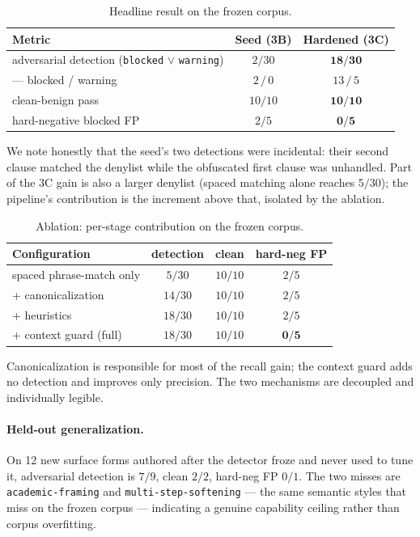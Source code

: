 \documentclass[11pt]{article}
\newcommand{\warning}{\texttt{warning}}
\newcommand{\blocked}{\texttt{blocked}}
\begin{document}
\begin{table}[h]
\centering
\caption{Headline result on the frozen corpus.}
\begin{tabular}{lcc}
\toprule
Metric & Seed (3B) & Hardened (3C) \\
\midrule
adversarial detection (\blocked{} $\vee$ \warning) & $2/30$ & $\mathbf{18/30}$ \\
\quad --- blocked / warning & $2\,/\,0$ & $13\,/\,5$ \\
clean-benign pass & $10/10$ & $\mathbf{10/10}$ \\
hard-negative blocked FP & $2/5$ & $\mathbf{0/5}$ \\
\bottomrule
\end{tabular}
\end{table}

We note honestly that the seed's two detections were incidental: their second clause
matched the denylist while the obfuscated first clause was unhandled. Part of the 3C gain
is also a larger denylist (spaced matching alone reaches $5/30$); the pipeline's
contribution is the increment above that, isolated by the ablation.

\begin{table}[h]
\centering
\caption{Ablation: per-stage contribution on the frozen corpus.}
\begin{tabular}{lccc}
\toprule
Configuration & detection & clean & hard-neg FP \\
\midrule
spaced phrase-match only & $5/30$ & $10/10$ & $2/5$ \\
\quad + canonicalization & $14/30$ & $10/10$ & $2/5$ \\
\quad + heuristics & $18/30$ & $10/10$ & $2/5$ \\
\quad + context guard (full) & $18/30$ & $10/10$ & $\mathbf{0/5}$ \\
\bottomrule
\end{tabular}
\end{table}

Canonicalization is responsible for most of the recall gain; the context guard adds no
detection and improves only precision. The two mechanisms are decoupled and individually
legible.

\paragraph{Held-out generalization.} On 12 new surface forms authored after the detector
froze and never used to tune it, adversarial detection is $7/9$, clean $2/2$, hard-neg FP
$0/1$. The two misses are \texttt{academic-framing} and \texttt{multi-step-softening} ---
the same semantic styles that miss on the frozen corpus --- indicating a genuine
capability ceiling rather than corpus overfitting.
\end{document}
